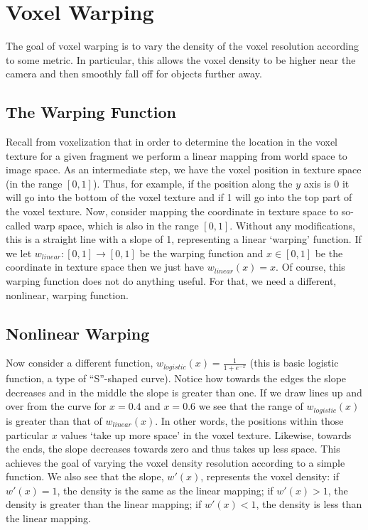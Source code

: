 
\section{Voxel Warping}
The goal of voxel warping is to vary the density of the voxel resolution according to some metric. In particular, this allows the voxel density to be higher near the camera and then smoothly fall off for objects further away.

\subsection{The Warping Function}
Recall from voxelization that in order to determine the location in the voxel texture for a given fragment we perform a linear mapping from world space to image space. As an intermediate step, we have the voxel position in texture space (in the range $[0, 1]$). Thus, for example, if the position along the $y$ axis is 0 it will go into the bottom of the voxel texture and if 1 will go into the top part of the voxel texture. Now, consider mapping the coordinate in texture space to so-called warp space, which is also in the range $[0, 1]$. Without any modifications, this is a straight line with a slope of 1, representing a linear `warping' function. If we let $w_{linear}: [0, 1] \rightarrow [0, 1]$ be the warping function and $x \in [0, 1]$ be the coordinate in texture space then we just have $w_{linear}(x) = x$. Of course, this warping function does not do anything useful. For that, we need a different, nonlinear, warping function.

\subsection{Nonlinear Warping}
Now consider a different function, $w_{logistic}(x) = \frac{1}{1 + e^{-x}}$ (this is basic logistic function, a type of ``S''-shaped curve). Notice how towards the edges the slope decreases and in the middle the slope is greater than one. If we draw lines up and over from the curve for $x = 0.4$ and $x = 0.6$ we see that the range of $w_{logistic}(x)$ is greater than that of $w_{linear}(x)$. In other words, the positions within those particular $x$ values `take up more space' in the voxel texture. Likewise, towards the ends, the slope decreases towards zero and thus takes up less space. This achieves the goal of varying the voxel density resolution according to a simple function. We also see that the slope, $w'(x)$, represents the voxel density: if $w'(x) = 1$, the density is the same as the linear mapping; if $w'(x) > 1$, the density is greater than the linear mapping; if $w'(x) < 1$, the density is less than the linear mapping.

